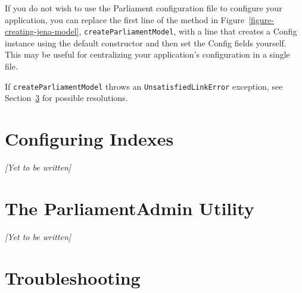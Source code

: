 If you do not wish to use the Parliament configuration file to configure your application, you can replace the first line of the method in Figure~\ref{figure-creating-jena-model}, \verb|createParliamentModel|, with a line that creates a Config instance using the default constructor and then set the Config fields yourself.  This may be useful for centralizing your application's configuration in a single file.

If \verb|createParliamentModel| throws an \verb|UnsatisfiedLinkError| exception, see Section~\ref{section-troubleshooting} for possible resolutions.

\section{Configuring Indexes}
\label{section-indexes}

\emph{[Yet to be written]}


\section{The ParliamentAdmin Utility}
\label{section-parliamentadmin-utility}

\emph{[Yet to be written]}

\section{Troubleshooting}
\label{section-troubleshooting}

